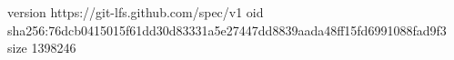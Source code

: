 version https://git-lfs.github.com/spec/v1
oid sha256:76dcb0415015f61dd30d83331a5e27447dd8839aada48ff15fd6991088fad9f3
size 1398246
